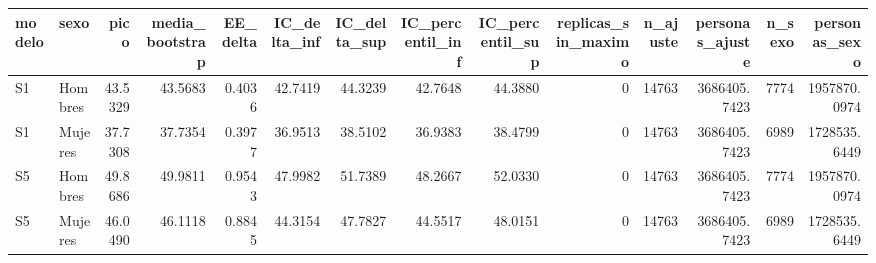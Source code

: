 \begin{tabular}{llrrrrrrrrrrrr}
\toprule
modelo & sexo & pico & media\_bootstrap & EE\_delta & IC\_delta\_inf & IC\_delta\_sup & IC\_percentil\_inf & IC\_percentil\_sup & replicas\_sin\_maximo & n\_ajuste & personas\_ajuste & n\_sexo & personas\_sexo \\
\midrule
S1 & Hombres & 43.5329 & 43.5683 & 0.4036 & 42.7419 & 44.3239 & 42.7648 & 44.3880 & 0 & 14763 & 3686405.7423 & 7774 & 1957870.0974 \\
S1 & Mujeres & 37.7308 & 37.7354 & 0.3977 & 36.9513 & 38.5102 & 36.9383 & 38.4799 & 0 & 14763 & 3686405.7423 & 6989 & 1728535.6449 \\
S5 & Hombres & 49.8686 & 49.9811 & 0.9543 & 47.9982 & 51.7389 & 48.2667 & 52.0330 & 0 & 14763 & 3686405.7423 & 7774 & 1957870.0974 \\
S5 & Mujeres & 46.0490 & 46.1118 & 0.8845 & 44.3154 & 47.7827 & 44.5517 & 48.0151 & 0 & 14763 & 3686405.7423 & 6989 & 1728535.6449 \\
\bottomrule
\end{tabular}
